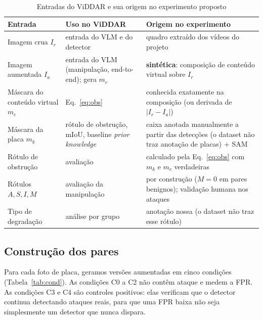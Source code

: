 \documentclass[journal,onecolumn]{IEEEtran}
\newcommand{\Ir}{I_r}
\newcommand{\Ia}{I_a}
\begin{document}
\begin{table}[!t]
\renewcommand{\arraystretch}{1.2}
\caption{Entradas do ViDDAR e sua origem no experimento proposto}
\label{tab:inputs}
\centering
\footnotesize
\begin{tabular}{L{3.4cm}L{5.2cm}L{6.6cm}}
\toprule
Entrada & Uso no ViDDAR & Origem no experimento \\
\midrule
Imagem crua $\Ir$ & entrada do VLM e do detector & quadro extraído dos vídeos do projeto \\
Imagem aumentada $\Ia$ & entrada do VLM (manipulação, end-to-end); gera $m_c$ & \textbf{sintética}: composição de conteúdo virtual sobre $\Ir$ \\
Máscara do conteúdo virtual $m_c$ & Eq.~\eqref{eq:obs} & conhecida exatamente na composição (ou derivada de $|\Ir-\Ia|$) \\
Máscara da placa $m_k$ & rótulo de obstrução, mIoU, baseline \emph{prior knowledge} & caixa anotada manualmente a partir das detecções (o dataset não traz anotação de placas) + SAM \\
Rótulo de obstrução & avaliação & calculado pela Eq.~\eqref{eq:obs} com $m_k$ e $m_c$ verdadeiras \\
Rótulos $A,S,I,M$ & avaliação da manipulação & por construção ($M=0$ em pares benignos); validação humana nos ataques \\
Tipo de degradação & análise por grupo & anotação nossa (o dataset não traz esse rótulo) \\
\bottomrule
\end{tabular}
\end{table}

\subsection{Construção dos pares}
Para cada foto de placa, geramos versões aumentadas em cinco condições (Tabela~\ref{tab:cond}). As
condições C0 a C2 não contêm ataque e medem a FPR. As condições C3 e C4 são controles positivos: elas
verificam que o detector continua detectando ataques reais, para que uma FPR baixa não seja
simplesmente um detector que nunca dispara.
\end{document}
